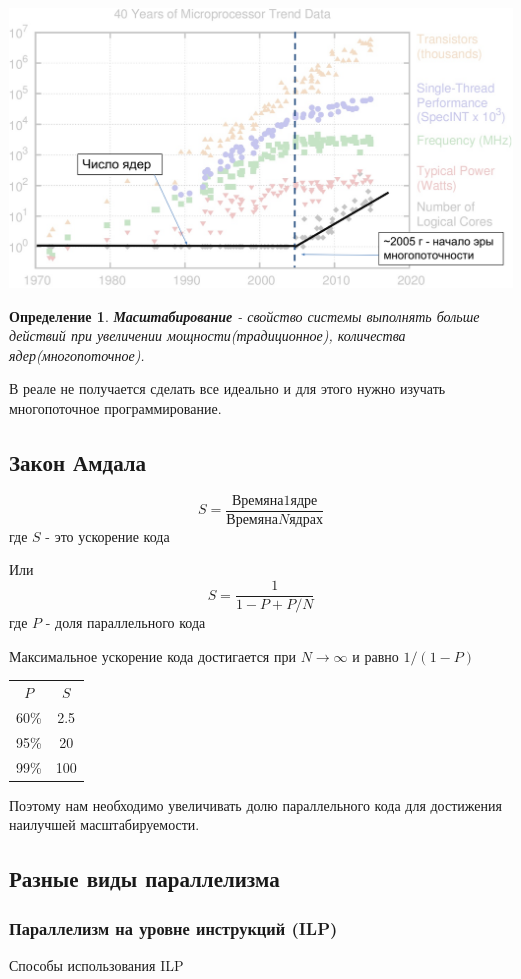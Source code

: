\documentclass[10pt,a4paper,oneside,titlepage]{article}
\theoremstyle{plain}
\theoremstyle{defenition}
\newtheorem*{defenition}{Определение}
\begin{document}
\includegraphics*[scale=0.5]{Mura4}

\begin{defenition}
	{\bfseries Масштабирование} - свойство системы выполнять больше действий при увеличении мощности(традиционное), количества ядер(многопоточное).
\end{defenition}

В реале не получается сделать все идеально и для этого нужно изучать многопоточное программирование.

\subsection{Закон Амдала}
$$
S=\frac{Время на 1 ядре}{Время на N ядрах}
$$
где $S$ - это ускорение кода

Или
$$
S=\frac{1}{1-P+P/N}
$$
где $P$ - доля параллельного кода

Максимальное ускорение кода достигается при $N\to \infty$ и равно $1/(1-P)$

\begin{tabular}{cc}
	$P$&$S$\\[5pt]
	60\%&2.5\\
	95\%&20\\
	99\%&100\\
\end{tabular}

Поэтому нам необходимо увеличивать долю параллельного кода для достижения наилучшей масштабируемости.

\subsection{Разные виды параллелизма}
\subsubsection{Параллелизм на уровне инструкций (ILP)}
Способы использования ILP
\end{document}
